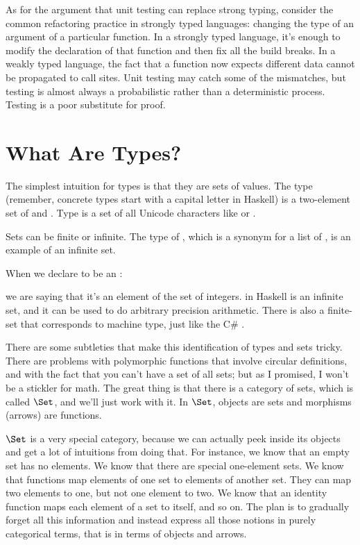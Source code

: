 As for the argument that unit testing can replace strong typing,
consider the common refactoring practice in strongly typed languages:
changing the type of an argument of a particular function. In a strongly
typed language, it's enough to modify the declaration of that function
and then fix all the build breaks. In a weakly typed language, the fact
that a function now expects different data cannot be propagated to call
sites. Unit testing may catch some of the mismatches, but testing is
almost always a probabilistic rather than a deterministic process.
Testing is a poor substitute for proof.

\section{What Are Types?}

The simplest intuition for types is that they are sets of values. The
type  (remember, concrete types start with a capital letter
in Haskell) is a two-element set of  and .
Type  is a set of all Unicode characters like
 or .

Sets can be finite or infinite. The type of , which is a
synonym for a list of , is an example of an infinite set.

When we declare  to be an :

we are saying that it's an element of the set of integers.
 in Haskell is an infinite set, and it can be used to do
arbitrary precision arithmetic. There is also a finite-set 
that corresponds to machine type, just like the C\# .

There are some subtleties that make this identification of types and
sets tricky. There are problems with polymorphic functions that involve
circular definitions, and with the fact that you can't have a set of all
sets; but as I promised, I won't be a stickler for math. The great thing
is that there is a category of sets, which is called $\Set$, and
we'll just work with it. In $\Set$, objects are sets and morphisms
(arrows) are functions.

$\Set$ is a very special category, because we can actually peek
inside its objects and get a lot of intuitions from doing that. For
instance, we know that an empty set has no elements. We know that there
are special one-element sets. We know that functions map elements of one
set to elements of another set. They can map two elements to one, but
not one element to two. We know that an identity function maps each
element of a set to itself, and so on. The plan is to gradually forget
all this information and instead express all those notions in purely
categorical terms, that is in terms of objects and arrows.

